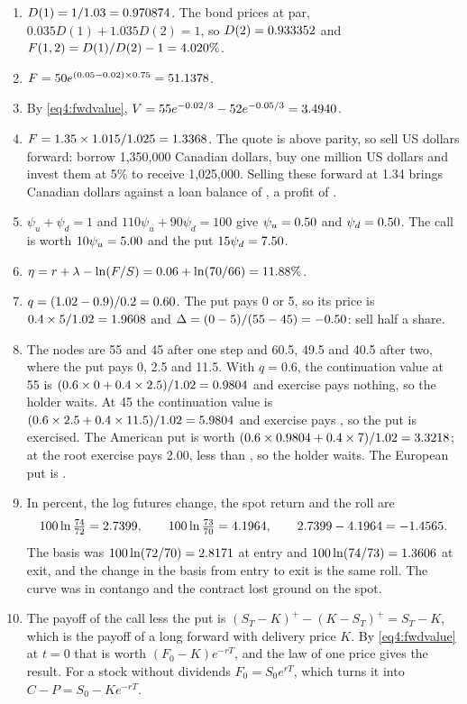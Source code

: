 \begin{chapterrefs}
\begin{enumerate}[label=\textbf{4.\arabic*}, leftmargin=*]
  \item $D(1)=1/1.03=0.970874$. The bond prices at par, $0.035D(1)+1.035D(2)=1$, so $D(2)=0.933352$
  and $F(1,2)=D(1)/D(2)-1=4.020\%$.
  \item $F=50e^{(0.05-0.02)\times0.75}=51.1378$.
  \item By \cref{eq4:fwdvalue}, $V=55e^{-0.02/3}-52e^{-0.05/3}=3.4940$.
  \item $F=1.35\times1.015/1.025=1.3368$. The quote is above parity, so sell US dollars forward:
  borrow 1,350,000 Canadian dollars, buy one million US dollars and invest them at 5\% to receive
  1,025,000. Selling these forward at 1.34 brings \exFourGet{} Canadian dollars against a loan balance
  of \exFourOwe, a profit of \exFourProfit.
  \item $\psi_u+\psi_d=1$ and $110\psi_u+90\psi_d=100$ give $\psi_u=0.50$ and
  $\psi_d=0.50$. The call is worth $10\psi_u=5.00$ and the put $15\psi_d=7.50$.
  \item $\eta=r+\lambda-\ln(F/S)=0.06+\ln(70/66)=11.88\%$.
  \item $q=(1.02-0.9)/0.2=0.60$. The put pays 0 or 5, so its price is $0.4\times5/1.02=1.9608$
  and $\Delta=(0-5)/(55-45)=-0.50$: sell half a share.
  \item The nodes are 55 and 45 after one step and 60.5, 49.5 and 40.5 after two, where the put pays
  0, 2.5 and 11.5. With $q=0.6$, the continuation value at 55 is $(0.6\times0+0.4\times2.5)/1.02=0.9804$
  and exercise pays nothing, so the holder waits. At 45 the continuation value is
  $(0.6\times2.5+0.4\times11.5)/1.02=5.9804$ and exercise pays \exEightExD, so the put is
  exercised. The American put is worth $(0.6\times0.9804+0.4\times7)/1.02=3.3218$; at the root
  exercise pays 2.00, less than \exEightAm, so the holder waits. The European put is \exEightEu.
  \item In percent, the log futures change, the spot return and the roll are
  \begin{equation*}
    100\ln\tfrac{74}{72}=2.7399,\qquad 100\ln\tfrac{73}{70}=4.1964,\qquad
    2.7399-4.1964=-1.4565 .
  \end{equation*}
  The basis was $100\ln(72/70)=2.8171$ at entry and $100\ln(74/73)=1.3606$ at exit,
  and the change in the basis from entry to exit is the same roll. The curve was in contango and the
  contract lost ground on the spot.
  \item The payoff of the call less the put is $(S_T-K)^+-(K-S_T)^+=S_T-K$, which is the payoff of a long
  forward with delivery price $K$. By \cref{eq4:fwdvalue} at $t=0$ that is worth $(F_0-K)e^{-rT}$, and
  the law of one price gives the result. For a stock without dividends $F_0=S_0e^{rT}$, which turns it
  into $C-P=S_0-Ke^{-rT}$.
\end{enumerate}


\end{chapterrefs}
